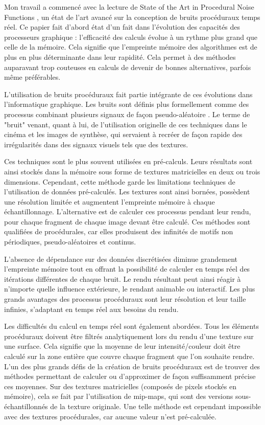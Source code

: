 \documentclass{article}
\begin{document}
Mon travail a commencé avec la lecture de State of the Art in Procedural Noise
Functions \cite{SOA_Noise}, un état de l'art avancé sur la conception de bruits
procéduraux temps réel. Ce papier fait d'abord état d'un fait dans l'évolution
des capacités des processeurs graphique : l'efficacité des calculs évolue à un
rythme plus grand que celle de la mémoire. Cela signifie que l'empreinte
mémoire des algorithmes est de plus en plus déterminante dans leur rapidité.
Cela permet à des méthodes auparavant trop couteuses en calculs de devenir de
bonnes alternatives, parfois même préférables.

L'utilisation de bruits procéduraux fait partie intégrante de ces évolutions
dans l'informatique graphique. Les bruits sont définis plus formellement comme
des processus combinant plusieurs signaux de façon pseudo-aléatoire
\cite{SOA_Noise}. Le terme de "bruit" venant, quant à lui, de l'utilisation
originelle de ces techniques dans le cinéma et les images de synthèse, qui
servaient à recréer de façon rapide des irrégularités dans des signaux visuels
tels que des textures.

Ces techniques sont le plus souvent utilisées en pré-calculs. Leurs résultats
sont ainsi stockés dans la mémoire sous forme de textures matricielles en deux
ou trois dimensions. Cependant, cette méthode garde les limitations techniques
de l'utilisation de données pré-calculés. Les textures sont ainsi bornées,
possèdent une résolution limitée et augmentent l'empreinte mémoire à chaque
échantillonnage. L'alternative est de calculer ces processus pendant leur
rendu, pour chaque fragment de chaque image devant être calculé. Ces méthodes
sont qualifiées de procédurales, car elles produisent des infinités de motifs
non périodiques, pseudo-aléatoires et continus.

L'absence de dépendance sur des données discrétisées diminue grandement
l'empreinte mémoire tout en offrant la possibilité de calculer en temps réel
des itérations différentes de chaque bruit. Le rendu résultant peut ainsi
réagir à n'importe quelle influence extérieure, le rendant animable ou
interactif. Les plus grands avantages des processus procéduraux sont leur
résolution et leur taille infinies, s'adaptant en temps réel aux besoins du
rendu.

Les difficultés du calcul en temps réel sont également abordées. Tous les
éléments procéduraux doivent être filtrés analytiquement lors du rendu d'une
texture sur une surface. Cela signifie que la moyenne de leur intensité/couleur
doit être calculé sur la zone entière que couvre chaque fragment que l'on
souhaite rendre. L'un des plus grands défis de la création de bruits
procéduraux est de trouver des méthodes permettant de calculer ou d'approximer
de façon suffisamment précise ces moyennes. Sur des textures matricielles
(composés de pixels stockés en mémoire), cela se fait par l'utilisation de
mip-maps, qui sont des versions sous-échantillonnés de la texture originale.
Une telle méthode est cependant impossible avec des textures procédurales, car
aucune valeur n'est pré-calculée.
\end{document}

